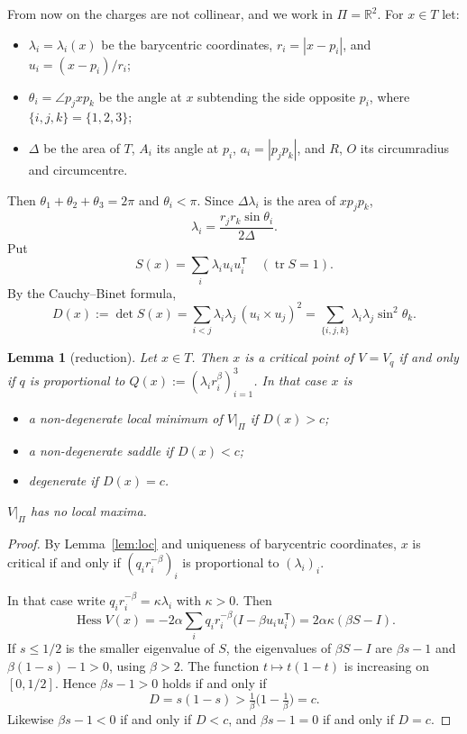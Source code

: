 \documentclass[11pt]{amsart}
\newtheorem{lemma}[theorem]{Lemma}
\theoremstyle{remark}
\newcommand{\R}{\mathbb{R}}
\DeclareMathOperator{\Hess}{Hess}
\begin{document}
From now on the charges are not collinear, and we work in $\Pi=\R^2$. For $x\in T$ let:
\begin{itemize}
\item $\lambda_i=\lambda_i(x)$ be the barycentric coordinates, $r_i=|x-p_i|$, and $u_i=(x-p_i)/r_i$;
\item $\theta_i=\angle p_jxp_k$ be the angle at $x$ subtending the side opposite $p_i$, where $\{i,j,k\}=\{1,2,3\}$;
\item $\Delta$ be the area of $T$, $A_i$ its angle at $p_i$, $a_i=|p_jp_k|$, and $R$, $O$ its circumradius and
  circumcentre.
\end{itemize}
Then $\theta_1+\theta_2+\theta_3=2\pi$ and $\theta_i<\pi$. Since $\Delta\lambda_i$ is the area of $xp_jp_k$,
\begin{equation}\label{eq:lambda}
  \lambda_i=\frac{r_jr_k\sin\theta_i}{2\Delta}.
\end{equation}
Put
\[
  S(x)=\sum_i\lambda_iu_iu_i^{\mathsf T}\quad(\operatorname{tr}S=1).
\]
By the Cauchy--Binet formula,
\begin{equation}\label{eq:D}
  D(x):=\det S(x)=\sum_{i<j}\lambda_i\lambda_j\,(u_i\times u_j)^2
        =\sum_{\{i,j,k\}}\lambda_i\lambda_j\sin^2\theta_k .
\end{equation}

\begin{lemma}[reduction]\label{lem:red}
Let $x\in T$. Then $x$ is a critical point of $V=V_q$ if and only if $q$ is proportional to
$Q(x):=(\lambda_ir_i^\beta)_{i=1}^3$. In that case $x$ is
\begin{itemize}
\item a non-degenerate local minimum of $V|_\Pi$ if $D(x)>c$;
\item a non-degenerate saddle if $D(x)<c$;
\item degenerate if $D(x)=c$.
\end{itemize}
$V|_\Pi$ has no local maxima.
\end{lemma}

\begin{proof}
By Lemma~\ref{lem:loc} and uniqueness of barycentric coordinates, $x$ is critical if and only if
$(q_ir_i^{-\beta})_i$ is proportional to $(\lambda_i)_i$.

In that case write $q_ir_i^{-\beta}=\kappa\lambda_i$ with $\kappa>0$. Then
\[
  \Hess V(x)=-2\alpha\sum_iq_ir_i^{-\beta}\bigl(I-\beta u_iu_i^{\mathsf T}\bigr)=2\alpha\kappa(\beta S-I).
\]
If $s\le 1/2$ is the smaller eigenvalue of $S$, the eigenvalues of $\beta S-I$ are $\beta s-1$ and $\beta(1-s)-1>0$,
using $\beta>2$. The function $t\mapsto t(1-t)$ is increasing on $[0,1/2]$. Hence $\beta s-1>0$ holds if and only if
\[
  D=s(1-s)>\tfrac1\beta\bigl(1-\tfrac1\beta\bigr)=c.
\]
Likewise $\beta s-1<0$ if and only if $D<c$, and $\beta s-1=0$ if and only if $D=c$.
\end{proof}
\end{document}
